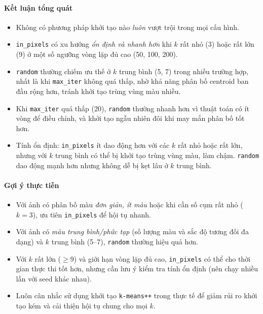 \begin{itemize}
\end{itemize}

\paragraph{Kết luận tổng quát}
\begin{itemize}
  \item Không có phương pháp khởi tạo nào \emph{luôn} vượt trội trong mọi cấu hình.
  \item \texttt{in\_pixels} có xu hướng \emph{ổn định và nhanh hơn} khi \(k\) rất nhỏ (3) hoặc rất lớn (9) ở một số ngưỡng vòng lặp đủ cao (50, 100, 200).
  \item \texttt{random} thường chiếm ưu thế ở \(k\) trung bình (5, 7) trong nhiều trường hợp, nhất là khi \texttt{max\_iter} không quá thấp, nhờ khả năng phân bố centroid ban đầu rộng hơn, tránh khởi tạo trùng vùng màu nhiều.
  \item Khi \texttt{max\_iter} quá thấp (20), \texttt{random} thường nhanh hơn vì thuật toán có ít vòng để điều chỉnh, và khởi tạo ngẫu nhiên đôi khi may mắn phân bố tốt hơn.
  \item Tính ổn định: \texttt{in\_pixels} ít dao động hơn với các \(k\) rất nhỏ hoặc rất lớn, nhưng với \(k\) trung bình có thể bị khởi tạo trùng vùng màu, làm chậm. \texttt{random} dao động mạnh hơn nhưng không dễ bị kẹt lâu ở \(k\) trung bình.
\end{itemize}

\paragraph{Gợi ý thực tiễn}
\begin{itemize}
  \item Với ảnh có phân bố màu \emph{đơn giản, ít màu} hoặc khi cần số cụm rất nhỏ (\(k=3\)), ưu tiên \texttt{in\_pixels} để hội tụ nhanh.
  \item Với ảnh có \emph{màu trung bình/phức tạp} (số lượng màu và sắc độ tương đối đa dạng) và \(k\) trung bình (5–7), \texttt{random} thường hiệu quả hơn.
  \item Với \(k\) rất lớn (\(\geq9\)) và giới hạn vòng lặp đủ cao, \texttt{in\_pixels} có thể cho thời gian thực thi tốt hơn, nhưng cần lưu ý kiểm tra tính ổn định (nên chạy nhiều lần với seed khác nhau).
  \item Luôn cân nhắc sử dụng khởi tạo \texttt{k-means++} trong thực tế để giảm rủi ro khởi tạo kém và cải thiện hội tụ chung cho mọi \(k\).
\end{itemize}


